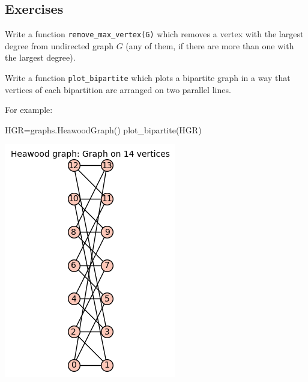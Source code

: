 \subsection{Exercises}

\begin{exercise}
    Write a function \verb|remove_max_vertex(G)| which removes a vertex with the largest degree from undirected graph $G$ (any of them, if there are more than one with the largest degree).
\end{exercise}
\begin{exercise}
    Write a function \verb|plot_bipartite| which plots a bipartite graph in a way that vertices of each bipartition are arranged on two parallel lines.
\end{exercise}
For example:
\begin{sageCell}
    HGR=graphs.HeawoodGraph()
    plot_bipartite(HGR)
\end{sageCell}
\begin{outImage}
    \includegraphics[width=0.4\linewidth]{Images/Introduction/output_bipartite.png}
\end{outImage}

